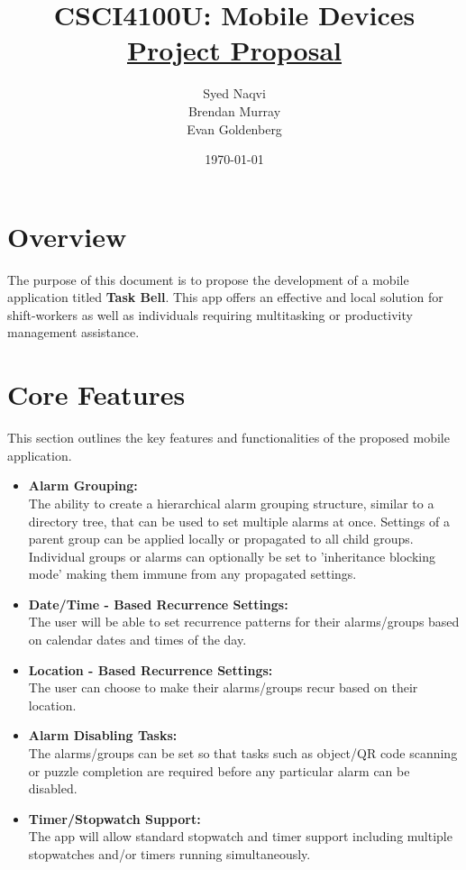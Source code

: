 \documentclass{article}
\title{\vspace*{100pt}CSCI4100U: Mobile Devices \\ \underline{Project Proposal} \vspace*{30pt}}
\author{
    Syed Naqvi \\ 
    Brendan Murray \\ 
    Evan Goldenberg
    \vspace*{30pt}
}
\date{\today}
\begin{document}
\maketitle
\newpage

\tableofcontents
\newpage

\section{Overview}
The purpose of this document is to propose the development of a mobile application titled \textbf{Task Bell}.
This app offers an effective and local solution for shift-workers as well as individuals requiring multitasking
or productivity management assistance.

\section{Core Features}
This section outlines the key features and functionalities of the proposed mobile application.
\begin{itemize}
    
    \item \textbf{Alarm Grouping:}\\The ability to create a hierarchical alarm grouping structure, similar to a directory tree,
    that can be used to set multiple alarms at once. Settings of a parent group can be applied locally or propagated to all child groups.
    Individual groups or alarms can optionally be set to 'inheritance blocking mode' making them immune from any propagated settings.

    \item \textbf{Date/Time - Based Recurrence Settings:}\\The user will be able to set recurrence patterns for their alarms/groups based on
    calendar dates and times of the day.

    \item \textbf{Location - Based Recurrence Settings:}\\The user can choose to make their alarms/groups recur based on their location.
    
    \item \textbf{Alarm Disabling Tasks:}\\The alarms/groups can be set so that tasks such as object/QR code scanning or puzzle completion
    are required before any particular alarm can be disabled.

    \item \textbf{Timer/Stopwatch Support:}\\The app will allow standard stopwatch and timer support including multiple stopwatches and/or
    timers running simultaneously.

\end{itemize}
\end{document}
